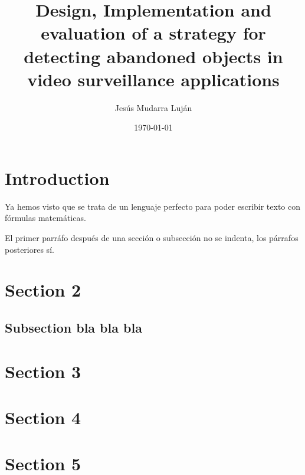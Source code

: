 \documentclass[12pt]{article}
\title{Design, Implementation and evaluation of a strategy for detecting abandoned objects in video surveillance applications}
\author{Jesús Mudarra Luján}
\date{\today} %
\begin{document}
\maketitle %
\tableofcontents %


\begin{abstract}
    \lipsum[2]
\end{abstract}


\section{Introduction}
Ya hemos visto que se trata de un lenguaje perfecto para poder escribir texto con fórmulas matemáticas.

El primer parráfo después de una sección o subsección no se indenta, los párrafos posteriores sí.


\section{Section 2}
\lipsum[7-9]


\subsection{Subsection bla bla bla}
\lipsum[10-12]


\section{Section 3}
\lipsum[13-15]


\section{Section 4}
\lipsum[16-18]


\section{Section 5}
\lipsum[20-22]
\end{document}
